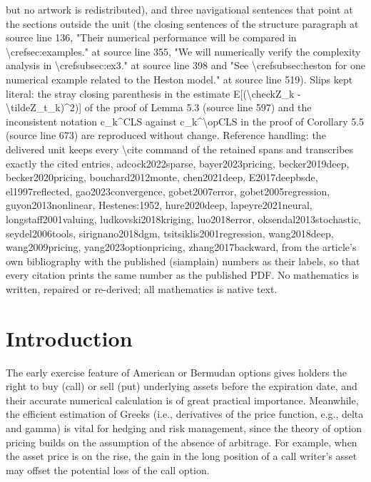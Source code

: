 \documentclass[10pt,a4paper]{amsart}
\numberwithin{equation}{section}
\numberwithin{algorithm}{section}
\theoremstyle{plain}
\theoremstyle{remark}
\begin{document}
but no artwork is redistributed), and three navigational sentences that point at the sections outside the unit (the closing sentences of the structure paragraph at source line 136, "Their numerical performance will be compared in \textbackslash{}cref{sec:examples}." at source line 355, "We will numerically verify the complexity analysis in \textbackslash{}cref{subsec:ex3}." at source line 398 and "See \textbackslash{}cref{subsec:heston} for one numerical example related to the Heston model." at source line 519). Slips kept literal: the stray closing parenthesis in the estimate E[(\textbackslash{}check{Z}\_k - \textbackslash{}tilde{Z}\_{t\_k})\textasciicircum{}2)] of the proof of Lemma 5.3 (source line 597) and the inconsistent notation c\_k\textasciicircum{}{CLS} against c\_k\textasciicircum{}{\textbackslash{}op{CLS}} in the proof of Corollary 5.5 (source line 673) are reproduced without change. Reference handling: the delivered unit keeps every \textbackslash{}cite command of the retained spans and transcribes exactly the cited entries, adcock2022sparse, bayer2023pricing, becker2019deep, becker2020pricing, bouchard2012monte, chen2021deep, E2017deepbsde, el1997reflected, gao2023convergence, gobet2007error, gobet2005regression, guyon2013nonlinear, Hestenes:1952, hure2020deep, lapeyre2021neural, longstaff2001valuing, ludkovski2018kriging, luo2018error, oksendal2013stochastic, seydel2006tools, sirignano2018dgm, tsitsiklis2001regression, wang2018deep, wang2009pricing, yang2023optionpricing, zhang2017backward, from the article's own bibliography with the published (siamplain) numbers as their labels, so that every citation prints the same number as the published PDF. No mathematics is written, repaired or re-derived; all mathematics is native text.
\section{Introduction}
The early exercise feature of American or Bermudan options gives holders the right to buy (call) or sell (put) underlying assets before the expiration date, and their accurate numerical calculation is of great practical importance. Meanwhile, the efficient estimation of Greeks (i.e., derivatives of the price function, e.g., delta and gamma) is vital for hedging and risk management, since the theory of option pricing builds on the assumption of the absence of arbitrage. For example, when the asset price is on the rise, the gain in the long position of a call writer's asset may offset the potential loss of the call option.
\end{document}

